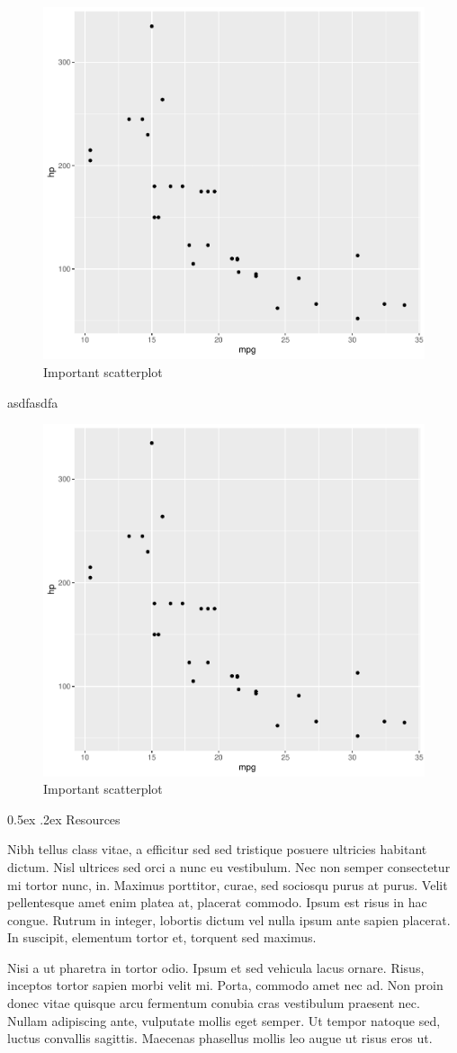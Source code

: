 \documentclass[11pt,]{article}
\makeatletter
\renewcommand\subsubsection{
  \@startsection{subsubsection}{3}{\z@}
    {-1.0ex\@plus -1ex \@minus -.2ex}%
    {0.5ex \@plus .2ex}%
    {\normalfont\normalsize\bf}} %
\makeatother
\begin{document}
\begin{figure}

{\centering \includegraphics[width=.3\textwidth]{research-strategy-orig_files/figure-latex/unnamed-chunk-2-1} 

}

\caption{Important scatterplot}\label{fig:unnamed-chunk-2}
\end{figure}

asdfasdfa

\begin{figure}

{\centering \includegraphics[width=.3\textwidth]{research-strategy-orig_files/figure-latex/unnamed-chunk-3-1} 

}

\caption{Important scatterplot}\label{fig:unnamed-chunk-3}
\end{figure}

\hypertarget{resources}{%
\subsubsection{Resources}\label{resources}}

Nibh tellus class vitae, a efficitur sed sed tristique posuere ultricies
habitant dictum. Nisl ultrices sed orci a nunc eu vestibulum. Nec non
semper consectetur mi tortor nunc, in. Maximus porttitor, curae, sed
sociosqu purus at purus. Velit pellentesque amet enim platea at,
placerat commodo. Ipsum est risus in hac congue. Rutrum in integer,
lobortis dictum vel nulla ipsum ante sapien placerat. In suscipit,
elementum tortor et, torquent sed maximus.

Nisi a ut pharetra in tortor odio. Ipsum et sed vehicula lacus ornare.
Risus, inceptos tortor sapien morbi velit mi. Porta, commodo amet nec
ad. Non proin donec vitae quisque arcu fermentum conubia cras vestibulum
praesent nec. Nullam adipiscing ante, vulputate mollis eget semper. Ut
tempor natoque sed, luctus convallis sagittis. Maecenas phasellus mollis
leo augue ut risus eros ut.
\end{document}
